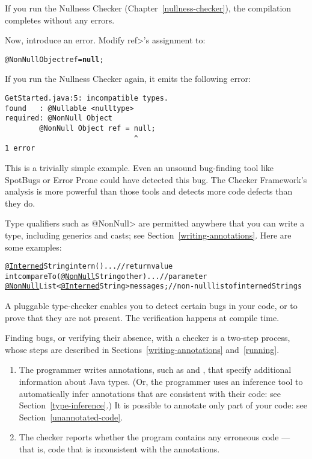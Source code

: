If you run the Nullness Checker (Chapter~\ref{nullness-checker}), the
compilation completes without any errors.

Now, introduce an error.  Modify \<ref>'s assignment to:
\begin{alltt}
  @NonNull Object ref = \textbf{null};
\end{alltt}

If you run the Nullness Checker again, it emits
  the following error:
\begin{Verbatim}
GetStarted.java:5: incompatible types.
found   : @Nullable <nulltype>
required: @NonNull Object
        @NonNull Object ref = null;
                              ^
1 error
\end{Verbatim}

This is a trivially simple example.  Even an unsound bug-finding tool like
SpotBugs or Error Prone could have detected this bug.  The
Checker Framework's analysis is more powerful than those tools and detects
more code defects than they do.

Type qualifiers such as \<@NonNull> are permitted anywhere
that you can write a type, including generics and casts; see
Section~\ref{writing-annotations}.  Here are some examples:

\begin{alltt}
  \underline{@Interned} String intern() \ttlcb{} ... \ttrcb{}             // return value
  int compareTo(\underline{@NonNull} String other) \ttlcb{} ... \ttrcb{}  // parameter
  \underline{@NonNull} List<\underline{@Interned} String> messages;     // non-null list of interned Strings
\end{alltt}


\htmlhr
{}

A pluggable type-checker enables you to detect certain bugs in your code,
or to prove that they are not present.  The verification happens at compile
time.


Finding bugs, or verifying their absence, with a checker is a two-step process, whose steps are
described in Sections~\ref{writing-annotations} and~\ref{running}.

\begin{enumerate}

\item The programmer writes annotations, such as  and
  , that specify additional information about Java types.
  (Or, the programmer uses an inference tool to automatically infer
  annotations that are consistent with their code:  see Section~\ref{type-inference}.)
  It is possible to annotate only part of your code:  see
  Section~\ref{unannotated-code}.

\item The checker reports whether the program contains any erroneous code
  --- that is, code that is inconsistent with the annotations.

\end{enumerate}

